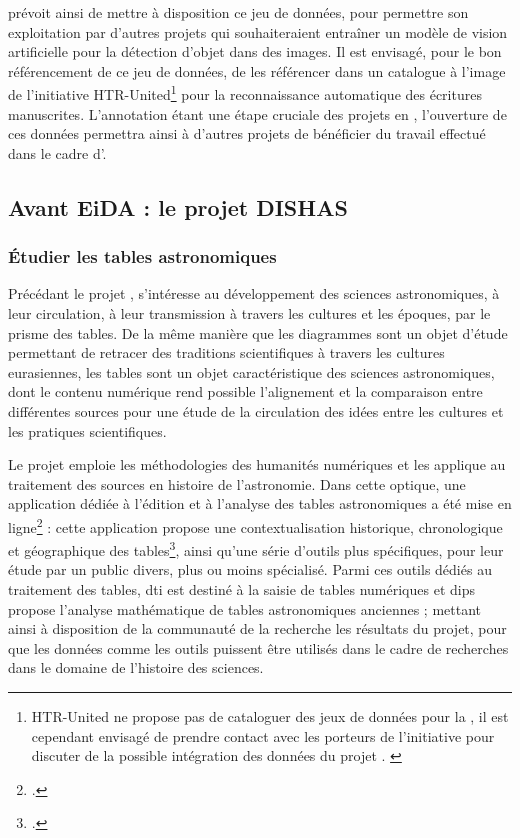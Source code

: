 	\eida prévoit ainsi de mettre à disposition ce jeu de données, pour permettre son exploitation par d'autres projets qui souhaiteraient entraîner un modèle de vision artificielle pour la détection d'objet dans des images. Il est envisagé, pour le bon référencement de ce jeu de données, de les référencer dans un catalogue à l'image de l'initiative HTR-United\footnote{HTR-United ne propose pas de cataloguer des jeux de données pour la \cv, il est cependant envisagé de prendre contact avec les porteurs de l'initiative pour discuter de la possible intégration des données du projet \eida. \cite{chagueHTRUnited}} pour la reconnaissance automatique des écritures manuscrites. L'annotation étant une étape cruciale des projets en \ml, l'ouverture de ces données permettra ainsi à d'autres projets de bénéficier du travail effectué dans le cadre d'\eida.

\subsection{Avant EiDA : le projet DISHAS}
    \subsubsection{Étudier les tables astronomiques}
	Précédant le projet \eida, \dishas s’intéresse au développement des sciences astronomiques, à leur circulation, à leur transmission à travers les cultures et les époques, par le prisme des tables. De la même manière que les diagrammes sont un objet d’étude permettant de retracer des traditions scientifiques à travers les cultures eurasiennes, les tables sont un objet caractéristique des sciences astronomiques, dont le contenu numérique rend possible l’alignement et la comparaison entre différentes sources pour une étude de la circulation des idées entre les cultures et les pratiques scientifiques.
	
	Le projet \dishas emploie les méthodologies des humanités numériques et les applique au traitement des sources en histoire de l’astronomie. Dans cette optique, une application dédiée à l’édition et à l’analyse des tables astronomiques a été mise en ligne\footcite{HomeDISHASProject} : cette application propose une contextualisation historique, chronologique et géographique des tables\footcite{HistoricalNavigationDISHAS}, ainsi qu’une série d’outils plus spécifiques, pour leur étude par un public divers, plus ou moins spécialisé. Parmi ces outils dédiés au traitement des tables, \acrfull{dti} est destiné à la saisie de tables numériques et \acrfull{dips} propose l’analyse mathématique de tables astronomiques anciennes ; mettant ainsi à disposition de la communauté de la recherche les résultats du projet, pour que les données comme les outils puissent être utilisés dans le cadre de recherches dans le domaine de l’histoire des sciences. 

